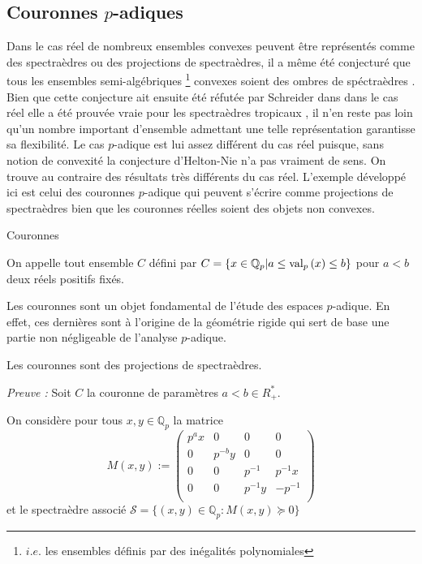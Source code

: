\subsection{Couronnes \texorpdfstring{$p$}{p}-adiques}
Dans le cas réel de nombreux ensembles convexes peuvent être représentés comme des spectraèdres ou des projections de spectraèdres, il a même été conjecturé que tous les ensembles semi-algébriques \footnote{$i.e.$ les ensembles définis par des inégalités polynomiales} convexes soient des ombres de spéctraèdres \cite{helton_sufficient_2008}. Bien que cette conjecture ait ensuite été réfutée par Schreider dans \cite{scheiderer_spectrahedral_2017} dans le cas réel elle a été prouvée vraie pour les spectraèdres tropicaux \cite{allamigeon_tropical_2019}, il n'en reste pas loin qu'un nombre important d'ensemble admettant une telle représentation garantisse sa flexibilité. 
	Le cas $p$-adique est lui assez différent du cas réel puisque, sans notion de convexité la conjecture d'Helton-Nie n'a pas vraiment de sens. On trouve au contraire des résultats très différents du cas réel. L'exemple développé ici est celui des couronnes $p$-adique qui peuvent s'écrire comme projections de spectraèdres bien que les couronnes réelles soient des objets non convexes.
\begin{definition}
	Couronnes

	On appelle  tout ensemble $C$ défini par $C = \{x \in \mathbb{Q}_{p}  | a\le \text{val}_p\left(x\right) \le b\} $ pour $a < b$ deux réels positifs fixés.
\end{definition}

Les couronnes sont un objet fondamental de l'étude des espaces $p$-adique. En effet, ces dernières sont à l'origine de la géométrie rigide qui sert de base une partie non négligeable de l'analyse $p$-adique. 
\begin{theoreme}
	Les couronnes sont des projections de spectraèdres.
\end{theoreme} 

\textit{Preuve :}
Soit $C$ la couronne de paramètres $a<b \in R^*_+$.

On considère pour tous $x,y \in \mathbb{Q}_{p} $ la matrice  $$M(x,y) :=
\begin{pmatrix} 
p^ax & 0 & 0 & 0 \\
0 & p^{-b}y & 0 & 0 \\
0 & 0 & p^{-1} & p^{-1}x \\
0 & 0 & p^{-1}y & - p^{-1}  \\
\end{pmatrix} $$ et le spectraèdre associé $\mathcal{S}= \{(x,y) \in \mathbb{Q}_{p}  : M(x,y) \succeq 0\} $

